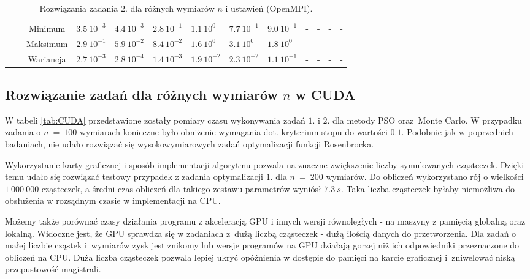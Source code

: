 \documentclass[11pt, a4paper, oneside]{article}
\begin{document}
\begin{table}[t]
\begin{adjustwidth}{-1.76cm}{}
\begin{tabular}{|c|c|c|l|l|l|l|l|l|c|c|c|c|}
                      &                               & Minimum   & $3.5 \ 10^{-3}$          & $4.4 \ 10^{-3}$         & $2.8 \ 10^{-1}$          & $1.1 \ 10^{0}$          & $7.7 \ 10^{-1}$          & $9.0 \ 10^{-1}$         & -           & -         & -           & -          \\ \cline{3-13} 
                      &                               & Maksimum  & $2.9 \ 10^{-1}$          & $5.9 \ 10^{-2}$         & $8.4 \ 10^{-2}$          & $1.6 \ 10^{0}$          & $3.1 \ 10^{0}$           & $1.8 \ 10^{0}$          & -           & -         & -           & -          \\ \cline{3-13} 
                      &                               & Wariancja & $2.7 \ 10^{-3}$          & $2.8 \ 10^{-4}$         & $1.4 \ 10^{-3}$          & $1.9 \ 10^{-2}$         & $2.3 \ 10^{-2}$          & $1.1 \ 10^{-1}$         & -           & -         & -           & -          \\ \hline
\end{tabular}
\end{adjustwidth}
\caption{Rozwiązania zadania $2$. dla różnych wymiarów $n$ i ustawień (OpenMPI).}
\label{tab:MPI:zad_2}
\end{table}

\subsection{Rozwiązanie zadań dla różnych wymiarów $n$ w CUDA} \label{sec:table:cuda}
W tabeli \ref{tab:CUDA} przedstawione zostały pomiary czasu wykonywania zadań $1$. i $2$. dla metody PSO oraz~Monte Carlo. W przypadku zadania o $n \ = \ 100$ wymiarach konieczne było obniżenie wymagania dot. kryterium stopu do wartości $0.1$. Podobnie jak w poprzednich badaniach, nie udało rozwiązać się wysokowymiarowych zadań optymalizacji funkcji Rosenbrocka.

Wykorzystanie karty graficznej i sposób implementacji algorytmu pozwala na znaczne zwiększenie liczby symulowanych cząsteczek. Dzięki temu udało się rozwiązać testowy przypadek z zadania optymalizacji $1.$ dla $n \ = \ 200$ wymiarów. Do obliczeń wykorzystano rój o wielkości $1 \ 000 \ 000$ cząsteczek, a średni czas obliczeń dla takiego zestawu parametrów wyniósł $7.3 \ s$. Taka liczba cząsteczek byłaby niemożliwa do obsłużenia w rozsądnym czasie w implementacji na CPU.

Możemy także porównać czasy działania programu z akceleracją GPU i innych wersji równoległych - na maszyny z pamięcią globalną oraz lokalną. Widoczne jest, że GPU sprawdza się w zadaniach z~dużą liczbą cząsteczek - dużą ilością danych do przetworzenia. Dla zadań o małej liczbie cząstek i~wymiarów zysk jest znikomy lub wersje programów na GPU działają gorzej niż ich odpowiedniki przeznaczone do obliczeń na CPU. Duża liczba cząsteczek pozwala lepiej ukryć opóźnienia w dostępie do pamięci na karcie graficznej i~zniwelować niską przepustowość magistrali.
\end{document}
